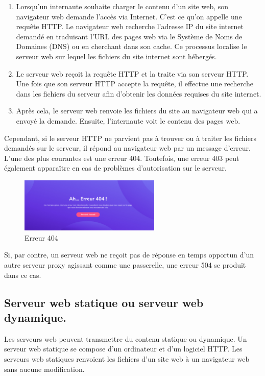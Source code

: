 \begin{enumerate}
\item Lorsqu’un internaute souhaite charger le contenu d’un site web, son navigateur web demande l’accès via Internet. C’est ce qu’on appelle une requête HTTP. Le navigateur web recherche l’adresse IP du site internet demandé en traduisant l’URL des pages web via le Système de Noms de Domaines (DNS) ou en cherchant dans son cache. Ce processus localise le serveur web sur lequel les fichiers du site internet sont hébergés.
\item  Le serveur web reçoit la requête HTTP et la traite via son serveur HTTP. Une fois que son serveur HTTP accepte la requête, il effectue une recherche dans les fichiers du serveur afin d’obtenir les données requises du site internet.

\item  Après cela, le serveur web renvoie les fichiers du site au navigateur web qui a envoyé la demande. Ensuite, l’internaute voit le contenu des pages web.\\


\end{enumerate}
Cependant, si le serveur HTTP ne parvient pas à trouver ou à traiter les fichiers demandés sur le serveur, il répond au navigateur web par un message d’erreur.\\
L’une des plus courantes est une erreur 404. Toutefois, une erreur 403 peut également apparaître en cas de problèmes d’autorisation sur le serveur.
\begin{figure}[h]
	\begin{center}
		\includegraphics[width=0.6\textwidth]{PhotoMemoire/erruer404.png}
	\end{center}
	\caption{ Erreur 404\cite{3}}
\end{figure}

Si, par contre, un serveur web ne reçoit pas de réponse en temps opportun d’un autre serveur proxy agissant comme une passerelle, une erreur 504 se produit dans ce cas.
\subsection{Serveur web statique ou serveur web dynamique.}
Les serveurs web peuvent transmettre du contenu statique ou dynamique. Un serveur web statique se compose d’un ordinateur et d’un logiciel HTTP. Les serveurs web statiques renvoient les fichiers d’un site web à un navigateur web sans aucune modification.\\

